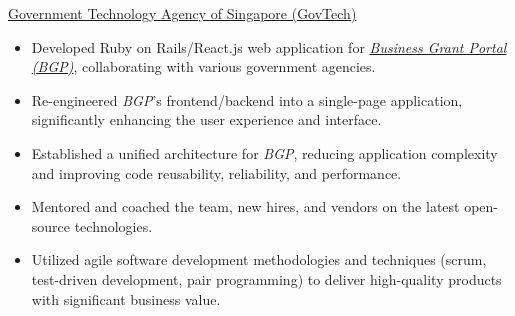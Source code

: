 \documentclass[]{cv} %
\begin{document}
\entry
{\href{https://www.tech.gov.sg/}{Government Technology Agency of Singapore (GovTech)}}
{
\begin{itemize}
\item Developed Ruby on Rails/React.js web application for \href{https://www.businessgrants.gov.sg/}{\emph{Business Grant Portal (BGP)}}, collaborating with various government agencies.
\item Re-engineered \emph{BGP}'s frontend/backend into a single-page application, significantly enhancing the user experience and interface.
\item Established a unified architecture for \emph{BGP}, reducing application complexity and improving code reusability, reliability, and performance.
\item Mentored and coached the team, new hires, and vendors on the latest open-source technologies.
\item Utilized agile software development methodologies and techniques (scrum, test-driven development, pair programming) to deliver high-quality products with significant business value.
\end{itemize}
}



\end{document}

